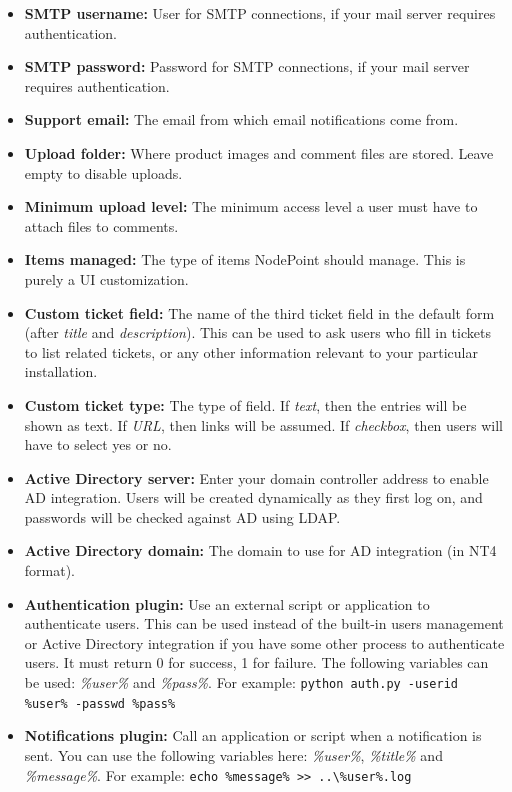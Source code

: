 \documentclass[11pt]{article}
\begin{document}
\begin{itemize}
\item \textbf{SMTP username:} User for SMTP connections, if your mail server requires authentication.
\item \textbf{SMTP password:} Password for SMTP connections, if your mail server requires authentication.
\item \textbf{Support email:} The email from which email notifications come from.
\item \textbf{Upload folder:} Where product images and comment files are stored. Leave empty to disable uploads.
\item \textbf{Minimum upload level:} The minimum access level a user must have to attach files to comments.
\item \textbf{Items managed:} The type of items NodePoint should manage. This is purely a UI customization.
\item \textbf{Custom ticket field:} The name of the third ticket field in the default form (after \textit{title} and \textit{description}). This can be used to ask users who fill in tickets to list related tickets, or any other information relevant to your particular installation.
\item \textbf{Custom ticket type:} The type of field. If \textit{text}, then the entries will be shown as text. If \textit{URL}, then links will be assumed. If \textit{checkbox}, then users will have to select yes or no.
\item \textbf{Active Directory server:} Enter your domain controller address to enable AD integration. Users will be created dynamically as they first log on, and passwords will be checked against AD using LDAP.
\item \textbf{Active Directory domain:} The domain to use for AD integration (in NT4 format).
\item \textbf{Authentication plugin:} Use an external script or application to authenticate users. This can be used instead of the built-in users management or Active Directory integration if you have some other process to authenticate users. It must return 0 for success, 1 for failure. The following variables can be used: \textit{\%user\%} and \textit{\%pass\%}. For example: \texttt{python auth.py -userid \%user\% -passwd \%pass\%}
\item \textbf{Notifications plugin:} Call an application or script when a notification is sent. You can use the following variables here: \textit{\%user\%}, \textit{\%title\%} and \textit{\%message\%}. For example: \texttt{echo \%message\% >> ..\textbackslash \%user\%.log}

\end{itemize}
\end{document}
